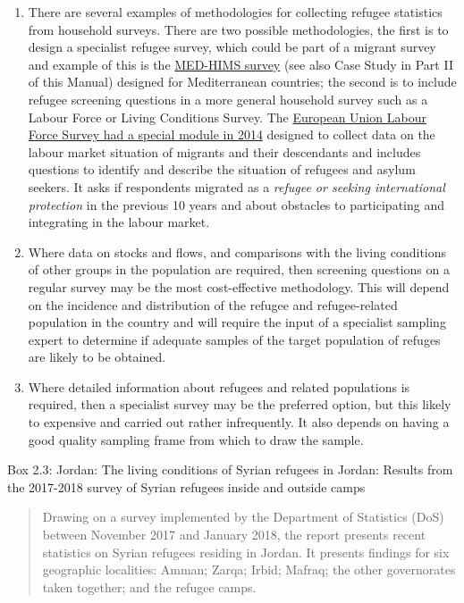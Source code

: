 \documentclass[
]{article}
\begin{document}
\begin{enumerate}
\def\labelenumi{\arabic{enumi}.}
\setcounter{enumi}{121}
\item
  There are several examples of methodologies for collecting refugee
  statistics from household surveys. There are two possible
  methodologies, the first is to design a specialist refugee survey,
  which could be part of a migrant survey and example of this is the
  \href{https://ec.europa.eu/eurostat/web/european-neighbourhood-policy/enp-south/med-hims}{MED-HIMS
  survey}
  (see also Case Study in Part II of this Manual) designed for
  Mediterranean countries; the second is to include refugee screening
  questions in a more general household survey such as a Labour Force
  or Living Conditions Survey. The \href{https://ec.europa.eu/eurostat/documents/1978984/6037334/Model-questionnaire-LFS-AHM-2014.pdf}{European Union Labour Force Survey
  had a special module in
  2014}
  designed to collect data on the labour market situation of migrants
  and their descendants and includes questions to identify and
  describe the situation of refugees and asylum seekers. It asks if
  respondents migrated as a \emph{refugee or seeking international
  protection} in the previous 10 years and about obstacles to
  participating and integrating in the labour market.
\item
  Where data on stocks and flows, and comparisons with the living
  conditions of other groups in the population are required, then
  screening questions on a regular survey may be the most
  cost-effective methodology. This will depend on the incidence and
  distribution of the refugee and refugee-related population in the
  country and will require the input of a specialist sampling expert
  to determine if adequate samples of the target population of refuges
  are likely to be obtained.
\item
  Where detailed information about refugees and related populations
  is required, then a specialist survey may be the preferred option,
  but this likely to expensive and carried out rather infrequently. It
  also depends on having a good quality sampling frame from which to
  draw the sample.
\end{enumerate}

Box 2.3: Jordan: The living conditions of Syrian refugees in Jordan:
Results from the 2017-2018 survey of Syrian refugees inside and outside
camps

\begin{quote}
Drawing on a survey implemented by the Department of Statistics (DoS) between November 2017 and January 2018, the report presents recent statistics on Syrian refugees residing in Jordan. It presents findings for six geographic localities: Amman; Zarqa; Irbid; Mafraq; the other governorates taken together; and the refugee camps.
\end{quote}
\end{document}
